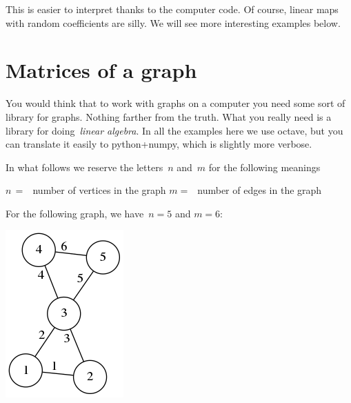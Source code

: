 This is easier to interpret thanks to the computer code.  Of course, linear
maps with random coefficients are silly.  We will see more interesting
examples below.


\section{Matrices of a graph}

You would think that to work with graphs on a computer you need some sort of
library for graphs.  Nothing farther from the truth.  What you really need is
a library for doing~\emph{linear algebra}.  In all the examples here we use
octave, but you can translate it easily to python+numpy, which is slightly
more verbose.

In what follows we reserve the letters~$n$ and~$m$ for the following meanings

$n\, =\ \,$ number of vertices in the graph\newline
$m =\ \,$ number of edges in the graph

For the following graph, we have~$n=5$ and $m=6$:

\includegraphics{gggx.png}


